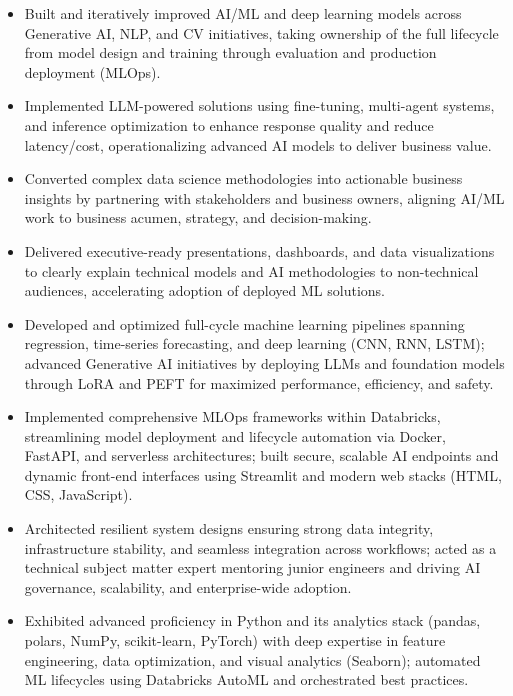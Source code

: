 \begin{itemize}
  \item Built and iteratively improved AI/ML and deep learning models across Generative AI, NLP,
        and CV initiatives, taking ownership of the full lifecycle from model design and training
        through evaluation and production deployment (MLOps).

  \item Implemented LLM-powered solutions using fine-tuning, multi-agent systems, and inference
        optimization to enhance response quality and reduce latency/cost, operationalizing advanced
        AI models to deliver business value.

  \item Converted complex data science methodologies into actionable business insights by partnering
        with stakeholders and business owners, aligning AI/ML work to business acumen, strategy,
        and decision-making.

  \item Delivered executive-ready presentations, dashboards, and data visualizations to clearly
        explain technical models and AI methodologies to non-technical audiences, accelerating
        adoption of deployed ML solutions.

  \item Developed and optimized full-cycle machine learning pipelines spanning regression,
        time-series forecasting, and deep learning (CNN, RNN, LSTM); advanced Generative AI
        initiatives by deploying LLMs and foundation models through LoRA and PEFT for maximized
        performance, efficiency, and safety.

  \item Implemented comprehensive MLOps frameworks within Databricks, streamlining model deployment
        and lifecycle automation via Docker, FastAPI, and serverless architectures; built secure,
        scalable AI endpoints and dynamic front-end interfaces using Streamlit and modern web
        stacks (HTML, CSS, JavaScript).

  \item Architected resilient system designs ensuring strong data integrity, infrastructure
        stability, and seamless integration across workflows; acted as a technical subject matter
        expert mentoring junior engineers and driving AI governance, scalability, and
        enterprise-wide adoption.

  \item Exhibited advanced proficiency in Python and its analytics stack (pandas, polars, NumPy,
        scikit-learn, PyTorch) with deep expertise in feature engineering, data optimization, and
        visual analytics (Seaborn); automated ML lifecycles using Databricks AutoML and orchestrated
        best practices.


\end{itemize}
